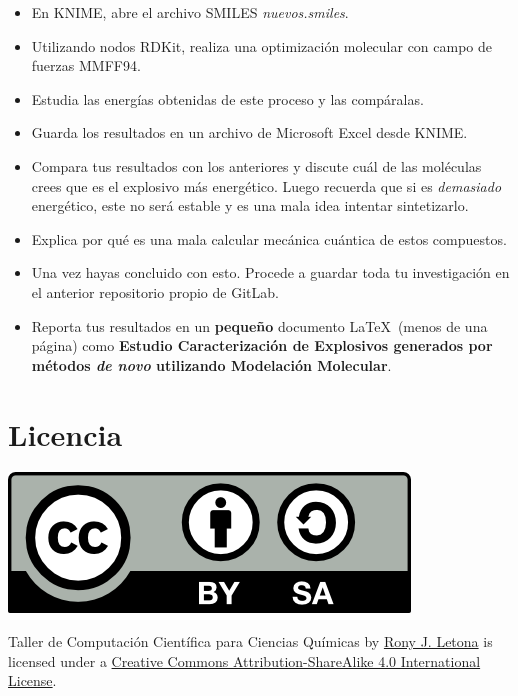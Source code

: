\documentclass[10pt,letterpaper]{article}
\begin{document}
\begin{itemize}
\item En KNIME, abre el archivo SMILES \textit{nuevos.smiles}.
\item Utilizando nodos RDKit, realiza una optimizaci\'on molecular con campo de fuerzas MMFF94.
\item Estudia las energ\'ias obtenidas de este proceso y las comp\'aralas.
\item Guarda los resultados en un archivo de Microsoft Excel desde KNIME.
\item Compara tus resultados con los anteriores y discute cu\'al de las mol\'eculas crees que es el explosivo m\'as energ\'etico. Luego recuerda que si es \emph{demasiado} energ\'etico, este no ser\'a estable y es una mala idea intentar sintetizarlo.
\item Explica por qu\'e es una mala calcular mec\'anica cu\'antica de estos compuestos.
\item Una vez hayas concluido con esto. Procede a guardar toda tu investigaci\'on en el anterior repositorio propio de GitLab.
\item Reporta tus resultados en un \textbf{peque\~no} documento \LaTeX\ (menos de una p\'agina) como \textbf{Estudio Caracterizaci\'on de Explosivos generados por m\'etodos \emph{de novo} utilizando Modelaci\'on Molecular}.
\end{itemize}

\section*{Licencia}

\noindent \includegraphics{img/cc_big.png}

\noindent Taller de Computaci\'on Cient\'ifica para Ciencias Qu\'imicas by \href{http://github.com/zronyj/TC3Q}{Rony J. Letona} is licensed under a \href{http://creativecommons.org/licenses/by-sa/4.0/}{Creative Commons Attribution-ShareAlike 4.0 International License}.
\end{document}

